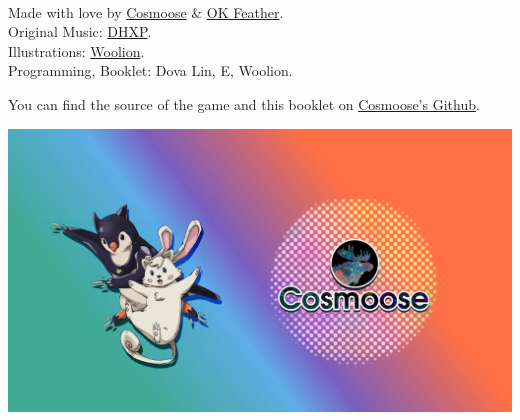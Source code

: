 \documentclass{article}
\begin{document}
\phantom{*}\\
Made with love by \href{https://cosmoose.org/}{Cosmoose} \& \href{https://okfeather.com/}{OK Feather}.\\
Original Music: \href{https://linktr.ee/dhxp}{DHXP}.\\
Illustrations: \href{https://twitter.com/wooliondraws}{Woolion}.\\
Programming, Booklet: Dova Lin, E, Woolion.

You can find the source of the game and this booklet on
\href{https://github.com/cosmoosic/cc-star}{Cosmoose's Github}.

\vspace*{\fill}

\begin{center}
    \includegraphics[height=.35\paperheight]{img/ccend}
\end{center}


\clearpage
\end{document}
